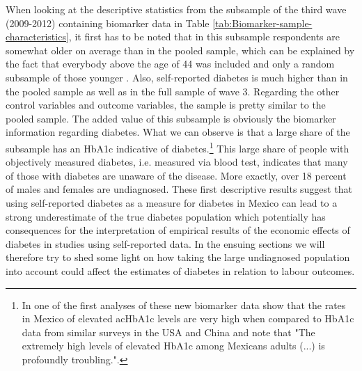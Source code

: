 When looking at the descriptive statistics from the subsample of the third wave (2009-2012) containing biomarker data in Table \ref{tab:Biomarker-sample-characteristics}, it first has to be noted that in this subsample respondents are somewhat older on average than in the pooled sample, which can be explained by the fact that everybody above the age of 44 was included and only a random subsample of those younger \cite{Crimmins2015}. Also, self-reported diabetes is much higher than in the pooled sample as well as in the full sample of wave 3. Regarding the other control variables and outcome variables, the sample is pretty similar to the pooled sample. The added value of this subsample is obviously the biomarker information regarding diabetes. What we can observe is that a large share of the subsample has an \ac{HbA1c} indicative of diabetes.\footnote{In one of the first analyses of these new biomarker data\citet{Frankenberg2015} show that the rates in Mexico of elevated ac{HbA1c} levels are very high when compared to \ac{HbA1c} data from similar surveys in the \ac{USA} and China and note that "The extremely high levels of elevated HbA1c among Mexicans adults (...) is profoundly troubling.".} This large share of people with objectively measured diabetes, i.e. measured via blood test, indicates that many of those with diabetes are unaware of the disease. More exactly, over 18 percent of males and females are undiagnosed. These first descriptive results suggest that using self-reported diabetes as a measure for diabetes in Mexico can lead to a strong underestimate of the true diabetes population which potentially has consequences for the interpretation of empirical results of the economic effects of diabetes in studies using self-reported data. In the ensuing sections we will therefore try to shed some light on how taking the large undiagnosed population into account could affect the estimates of diabetes in relation to labour outcomes. 


